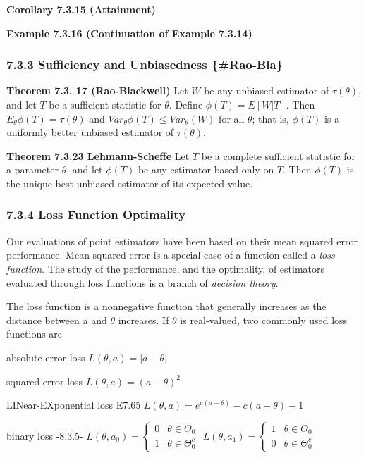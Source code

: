 \documentclass[10pt,twocolumn,portrait]{article}
\begin{document}
\textbf{Corollary 7.3.15 (Attainment)}

\textbf{Example 7.3.16 (Continuation of Example 7.3.14)}

\hypertarget{Lehm-Sche}{%
\subsubsection{7.3.3 Sufficiency and Unbiasedness
\{\#Rao-Bla\}}\label{Lehm-Sche}}

\textbf{Theorem 7.3. 17 (Rao-Blackwell)} Let \(W\) be any unbiased
estimator of \(\tau(\theta)\), and let \(T\) be a sufficient statistic
for \(\theta\). Define \(\phi(T)=E[W|T]\). Then
\(E_{\theta}\phi(T)=\tau(\theta)\) and
\(Var_{\theta}\phi(T)\le Var_{\theta}(W)\) for all \(\theta\); that is,
\(\phi(T)\) is a uniformly better unbiased estimator of
\(\tau(\theta)\).

\textbf{Theorem 7.3.23 Lehmann-Scheffe} Let \(T\) be a complete
sufficient statistic for a parameter \(\theta\), and let \(\phi(T)\) be
any estimator based only on \(T\). Then \(\phi(T)\) is the unique best
unbiased estimator of its expected value.

\hypertarget{loss-function-optimality}{%
\subsubsection{7.3.4 Loss Function
Optimality}\label{loss-function-optimality}}

Our evaluations of point estimators have been based on their mean
squared error performance. Mean squared error is a special case of a
function called a \emph{loss function}. The study of the performance,
and the optimality, of estimators evaluated through loss functions is a
branch of \emph{decision theory}.

The loss function is a nonnegative function that generally increases as
the distance between a and \(\theta\) increases. If \(\theta\) is
real-valued, two commonly used loss functions are

absolute error loss \(L(\theta,a)=|a-\theta|\)

squared error loss \(L(\theta,a)=(a-\theta)^2\)

LINear-EXponential loss E7.65
\(L(\theta,a)=e^{c(a-\theta)}-c(a-\theta)-1\)

binary loss -8.3.5-
\(L(\theta,a_0)=\begin{cases}0&\theta\in\Theta_0\\1&\theta\in\Theta^c_0\end{cases}\)
\(L(\theta,a_1)=\begin{cases}1&\theta\in\Theta_0\\0&\theta\in\Theta^c_0\end{cases}\)
\end{document}
